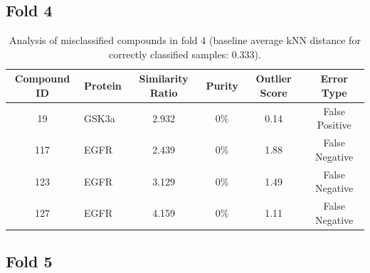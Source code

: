 \documentclass{article}
\newenvironment{smarttabular}[1]{%
    \begin{tabular}{#1}%
}{%
    \end{tabular}%
}
\begin{document}
\clearpage

\subsection{Fold 4}

\begin{table}[H]
    \centering
    \small
    \caption{Analysis of misclassified compounds in fold 4 (baseline average kNN distance for correctly classified samples: 0.333).}
    \label{tab:misclassified_compounds_4}
    \begin{smarttabular}{clcccc}
        \toprule
        \textbf{Compound ID} & \textbf{Protein} & \textbf{Similarity Ratio} & \textbf{Purity} & \textbf{Outlier Score} & \textbf{Error Type} \\
        \midrule
        19 & GSK3a & 2.932 & 0\% & 0.14 & False Positive \\
        117 & EGFR & 2.439 & 0\% & 1.88 & False Negative \\
        123 & EGFR & 3.129 & 0\% & 1.49 & False Negative \\
        127 & EGFR & 4.159 & 0\% & 1.11 & False Negative \\
        \bottomrule
    \end{smarttabular}
\end{table}

\clearpage

\subsection{Fold 5}
\end{document}
